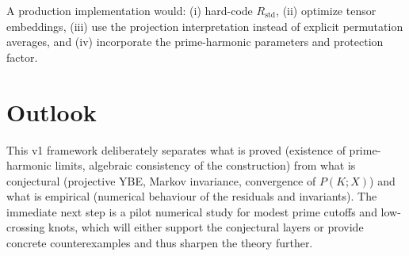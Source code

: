 \documentclass[11pt]{article}
\begin{document}
A production implementation would:
(i) hard-code $R_{\mathrm{std}}$,
(ii) optimize tensor embeddings,
(iii) use the projection interpretation instead of explicit permutation averages, and
(iv) incorporate the prime-harmonic parameters and protection factor.

\section{Outlook}

This v1 framework deliberately separates what is proved (existence of prime-harmonic limits, algebraic consistency of the construction) from what is conjectural (projective YBE, Markov invariance, convergence of $P(K;X)$) and what is empirical (numerical behaviour of the residuals and invariants).
The immediate next step is a pilot numerical study for modest prime cutoffs and low-crossing knots, which will either support the conjectural layers or provide concrete counterexamples and thus sharpen the theory further.


\nocite{*}


\end{document}
